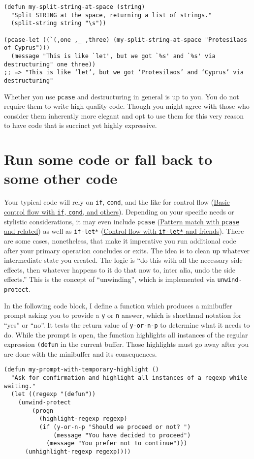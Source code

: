 \documentclass[11pt]{ctexart}
\begin{document}
\begin{verbatim}
(defun my-split-string-at-space (string)
  "Split STRING at the space, returning a list of strings."
  (split-string string "\s"))

(pcase-let ((`(,one ,_ ,three) (my-split-string-at-space "Protesilaos of Cyprus")))
  (message "This is like `let', but we got `%s' and `%s' via destructuring" one three))
;; => "This is like ‘let’, but we got ‘Protesilaos’ and ‘Cyprus’ via destructuring"
\end{verbatim}

Whether you use \texttt{pcase} and destructuring in general is up to you. You do not require them to write high quality code. Though you might agree with those who consider them inherently more elegant and opt to use them for this very reason to have code that is succinct yet highly expressive.
\section{Run some code or fall back to some other code}
\label{sec:orgd0c57f0}
Your typical code will rely on \texttt{if}, \texttt{cond}, and the like for control flow (\hyperref[sec:org9074f8f]{Basic control flow with \texttt{if}, \texttt{cond}, and others}). Depending on your specific needs or stylistic considerations, it may even include \texttt{pcase} (\hyperref[sec:orgc256332]{Pattern match with \texttt{pcase} and related}) as well as \texttt{if-let*} (\hyperref[sec:org8aa5d4d]{Control flow with \texttt{if-let*} and friends}). There are some cases, nonetheless, that make it imperative you run additional code after your primary operation concludes or exits. The idea is to clean up whatever intermediate state you created. The logic is ``do this with all the necessary side effects, then whatever happens to it do that now to, inter alia, undo the side effects.'' This is the concept of ``unwinding'', which is implemented via \texttt{unwind-protect}.

In the following code block, I define a function which produces a minibuffer prompt asking you to provide a \texttt{y} or \texttt{n} answer, which is shorthand notation for ``yes'' or ``no''. It tests the return value of \texttt{y-or-n-p} to determine what it needs to do. While the prompt is open, the function highlights all instances of the regular expression \texttt{(defun} in the current buffer. Those highlights must go away after you are done with the minibuffer and its consequences.

\begin{verbatim}
(defun my-prompt-with-temporary-highlight ()
  "Ask for confirmation and highlight all instances of a regexp while waiting."
  (let ((regexp "(defun"))
    (unwind-protect
        (progn
          (highlight-regexp regexp)
          (if (y-or-n-p "Should we proceed or not? ")
              (message "You have decided to proceed")
            (message "You prefer not to continue")))
      (unhighlight-regexp regexp))))
\end{verbatim}
\end{document}
